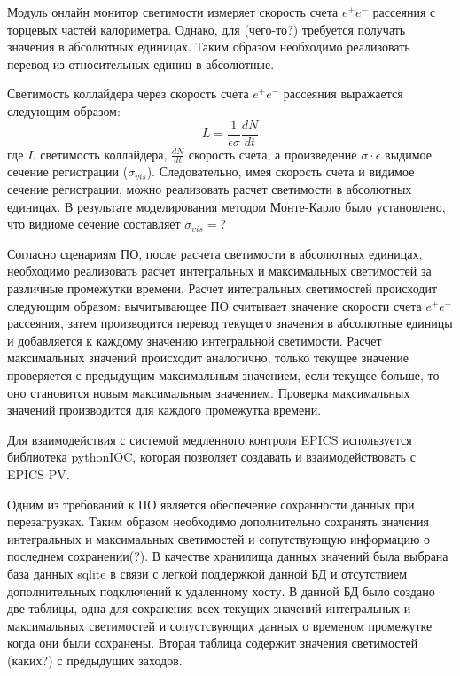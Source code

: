   Модуль онлайн монитор светимости измеряет скорость счета $e^+e^-$ рассеяния с торцевых частей калориметра. Однако, для (чего-то?) требуется получать значения в абсолютных единицах. Таким образом необходимо реализовать перевод из относительных единиц в абсолютные.\par
 Светимость коллайдера через скорость счета $e^+e^-$ рассеяния выражается следующим образом:
\begin{equation}
  L = \frac{1}{\epsilon\sigma}\frac{dN}{dt} 
\end{equation}
где $L$ светимость коллайдера, $\frac{dN}{dt}$ скорость счета, а произведение $\sigma\cdot\epsilon$ выдимое сечение регистрации ($\sigma_{vis}$). Следовательно, имея скорость счета и видимое сечение регистрации, можно реализовать расчет светимости в абсолютных единицах. В результате моделирования методом Монте-Карло было установлено, что видиоме сечение составляет $\sigma_{vis}=$?\par
  Согласно сценариям ПО, после расчета светимости в абсолютных единицах, необходимо реализовать расчет интегральных и максимальных светимостей за различные промежутки времени. Расчет интегральных светимостей происходит следующим образом: вычитывающее ПО считывает значение скорости счета $e^+e^-$ рассеяния, затем производится перевод текущего значения в абсолютные единицы и добавляется к каждому значению интегральной светимости. Расчет максимальных значений происходит аналогично, только текущее значение проверяется с предыдущим максимальным значением, если текущее больше, то оно становится новым максимальным значением. Проверка максимальных значений производится для каждого промежутка времени.\par
  Для взаимодействия с системой медленного контроля EPICS используется библиотека pythonIOC, которая позволяет создавать и взаимодействовать с EPICS PV.\par
  Одним из требований к ПО является обеспечение сохранности данных при перезагрузках. Таким образом необходимо дополнительно сохранять значения интегральных и максимальных светимостей и сопутствующую информацию о последнем сохранении(?). В качестве хранилища данных значений была выбрана база данных sqlite в связи с легкой поддержкой данной БД и отсутствием дополнительных подключений к удаленному хосту. В данной БД было создано две таблицы, одна для сохранения всех текущих значений интегральных и максимальных светимостей и сопустсвующих данных о временом промежутке когда они были сохранены. Вторая таблица содержит значения светимостей (каких?) с предыдущих заходов.
